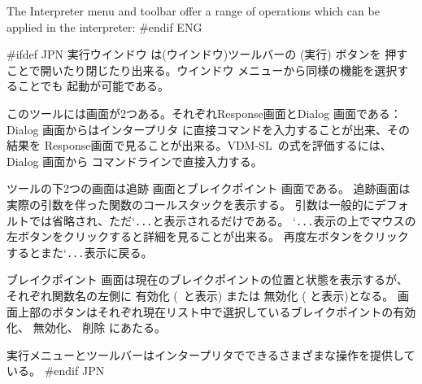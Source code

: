 \documentclass[\pformat,12pt]{article}
\newcommand{\vdmslpp}{VDM-SL}
\newcommand{\vdmslpp}{VDM++}
\newcommand{\Lit}[1]{`#1\Quote}
\newcommand{\Sig}[1]{\Lit{{\tt #1}}}
\newcommand{\guicmd}[1]{{\sf #1}}
\newcommand{\guicmd}[1]{{\gt #1}}
\begin{document}
The \guicmd{Interpreter} menu and toolbar offer a range of
operations which can be applied in the
interpreter:
#endif ENG

#ifdef JPN
\guicmd{実行ウインドウ} は(\guicmd{ウインドウ})ツールバーの
(\guicmd{実行}) ボタンを
押すことで開いたり閉じたり出来る。\guicmd{ウインドウ} メニューから同様の機能を選択することでも
起動が可能である。

このツールには画面が2つある。それぞれ\guicmd{Response}画面と\guicmd{Dialog} 画面である：
\guicmd{Dialog} 画面からは\guicmd{インタープリタ} に直接コマンドを入力することが出来、その結果を
\guicmd{Response}画面で見ることが出来る。\vdmslpp\ の式を評価するには、\guicmd{Dialog} 画面から
コマンドラインで直接入力する。

ツールの下2つの画面は\guicmd{追跡} 画面と\guicmd{ブレイクポイント} 画面である。
\guicmd{追跡}画面は実際の引数を伴った関数のコールスタックを表示する。
引数は一般的にデフォルトでは省略され、ただ\Sig{...}と表示されるだけである。
\Sig{...}表示の上でマウスの左ボタンをクリックすると詳細を見ることが出来る。
再度左ボタンをクリックするとまた\Sig{...}表示に戻る。


\guicmd{ブレイクポイント} 画面は現在のブレイクポイントの位置と状態を表示するが、それぞれ関数名の左側に
\guicmd{有効化} (\raisebox{0.5mm}{{\fbox{\tt\tiny
      $\surd$}}}\ と表示) または
\guicmd{無効化} (
\raisebox{1mm}{{\fbox{\rule[-0.75mm]{0mm}{1.5mm}{\hspace*{1.5mm}}}}}と表示)となる。
画面上部のボタンはそれぞれ現在リスト中で選択しているブレイクポイントの有効化、
無効化、
削除 にあたる。

\guicmd{実行}メニューとツールバーはインタープリタでできるさまざまな操作を提供している。
#endif JPN
\end{document}
